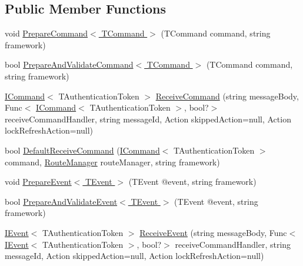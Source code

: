 \subsection*{Public Member Functions}
\begin{DoxyCompactItemize}
\item 
void \hyperlink{interfaceCqrs_1_1Azure_1_1ServiceBus_1_1IAzureBusHelper_ad25c4130a4357504cfccba49999493c7_ad25c4130a4357504cfccba49999493c7}{Prepare\+Command$<$ T\+Command $>$} (T\+Command command, string framework)
\item 
bool \hyperlink{interfaceCqrs_1_1Azure_1_1ServiceBus_1_1IAzureBusHelper_a283ee2cf9241a5364dd5569a9f12fa10_a283ee2cf9241a5364dd5569a9f12fa10}{Prepare\+And\+Validate\+Command$<$ T\+Command $>$} (T\+Command command, string framework)
\item 
\hyperlink{interfaceCqrs_1_1Commands_1_1ICommand}{I\+Command}$<$ T\+Authentication\+Token $>$ \hyperlink{interfaceCqrs_1_1Azure_1_1ServiceBus_1_1IAzureBusHelper_a16dd52eec62dd41df564bb25467b710d_a16dd52eec62dd41df564bb25467b710d}{Receive\+Command} (string message\+Body, Func$<$ \hyperlink{interfaceCqrs_1_1Commands_1_1ICommand}{I\+Command}$<$ T\+Authentication\+Token $>$, bool?$>$ receive\+Command\+Handler, string message\+Id, Action skipped\+Action=null, Action lock\+Refresh\+Action=null)
\item 
bool \hyperlink{interfaceCqrs_1_1Azure_1_1ServiceBus_1_1IAzureBusHelper_a3c632e92e0e38110f9e7721fb31700d1_a3c632e92e0e38110f9e7721fb31700d1}{Default\+Receive\+Command} (\hyperlink{interfaceCqrs_1_1Commands_1_1ICommand}{I\+Command}$<$ T\+Authentication\+Token $>$ command, \hyperlink{classCqrs_1_1Bus_1_1RouteManager}{Route\+Manager} route\+Manager, string framework)
\item 
void \hyperlink{interfaceCqrs_1_1Azure_1_1ServiceBus_1_1IAzureBusHelper_ab7d1fa5162adc0f01edcf9039bb43c2c_ab7d1fa5162adc0f01edcf9039bb43c2c}{Prepare\+Event$<$ T\+Event $>$} (T\+Event @event, string framework)
\item 
bool \hyperlink{interfaceCqrs_1_1Azure_1_1ServiceBus_1_1IAzureBusHelper_ac5cbeb6e8bbdb1a98501f0b746c12abd_ac5cbeb6e8bbdb1a98501f0b746c12abd}{Prepare\+And\+Validate\+Event$<$ T\+Event $>$} (T\+Event @event, string framework)
\item 
\hyperlink{interfaceCqrs_1_1Events_1_1IEvent}{I\+Event}$<$ T\+Authentication\+Token $>$ \hyperlink{interfaceCqrs_1_1Azure_1_1ServiceBus_1_1IAzureBusHelper_a435d1d63e37ea149087f254f4b73b94a_a435d1d63e37ea149087f254f4b73b94a}{Receive\+Event} (string message\+Body, Func$<$ \hyperlink{interfaceCqrs_1_1Events_1_1IEvent}{I\+Event}$<$ T\+Authentication\+Token $>$, bool?$>$ receive\+Command\+Handler, string message\+Id, Action skipped\+Action=null, Action lock\+Refresh\+Action=null)

\end{DoxyCompactItemize}
